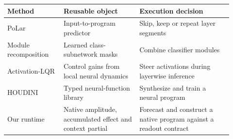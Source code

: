 \begin{tabular}{@{}>{\raggedright\arraybackslash}p{0.23\linewidth}>{\raggedright\arraybackslash}p{0.31\linewidth}>{\raggedright\arraybackslash}p{0.38\linewidth}@{}}
\toprule
Method & Reusable object & Execution decision\\
\midrule
PoLar \citep{polar} & Input-to-program predictor & Skip, keep or repeat layer segments\\[0.35em]
Module recomposition \citep{recomposition} & Learned class-subnetwork masks & Combine classifier modules\\[0.35em]
Activation-LQR \citep{alqr} & Control gains from local neural dynamics & Steer activations during layerwise inference\\[0.35em]
HOUDINI \citep{houdini} & Typed neural-function library & Synthesize and train a neural program\\[0.35em]
Our runtime & Native amplitude, accumulated effect and context partial & Forecast and construct a native program against a readout contract\\
\bottomrule
\end{tabular}

